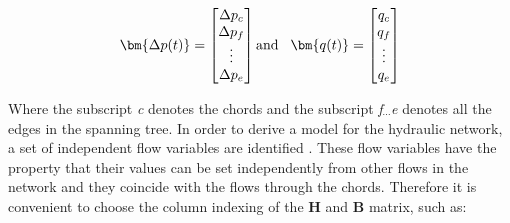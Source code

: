 
\begin{equation}
\bm{\Delta p(t)} =
\begin{bmatrix}
         \Delta p_c \\
	\Delta p_f \\ 
	\vdots \\
	\Delta p_e \\
\end{bmatrix}
\text{and}\hspace{0.3cm}
\bm{q(t)} =
\begin{bmatrix}
         q_c \\
	q_f \\ 
	\vdots \\
	q_e \\
\end{bmatrix}
\end{equation}

Where the subscript \textit{c} denotes the chords and the subscript \textit{f$_{\cdots}$e} denotes all the edges in the spanning tree.  
In order to derive a model for the hydraulic network, a set of independent flow variables are identified \cite{TowerModel}. These flow variables have the property that their values can be set independently from other flows in the network and they coincide with the flows through the chords. 
Therefore it is convenient to choose the column indexing of the 
$\pmb{H}$ and $\pmb{B}$ matrix, such as:




